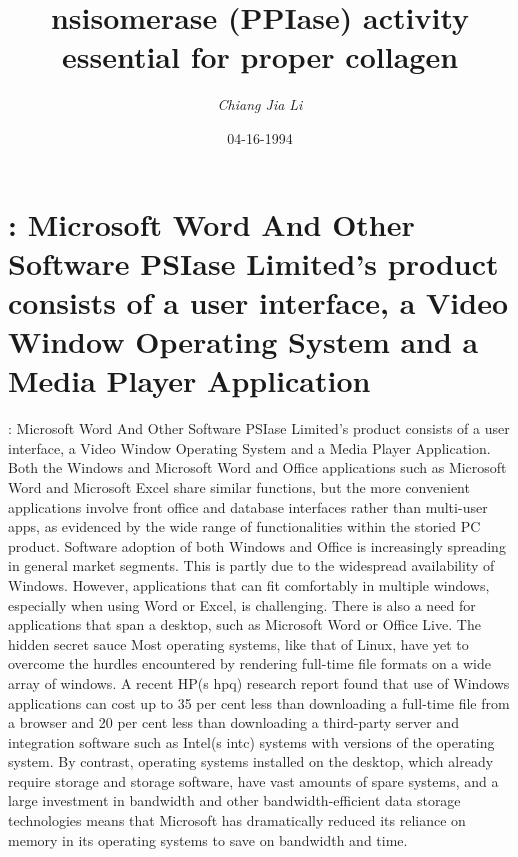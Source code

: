 \documentclass{article}%
\title{nsisomerase (PPIase) activity essential for proper collagen}%
\author{\textit{Chiang Jia Li}}%
\date{04-16-1994}%
\begin{document}
%
\normalsize%
\maketitle%
\section{: Microsoft Word And Other Software\newline%
PSIase Limited's product consists of a user interface, a Video Window Operating System and a Media Player Application}%
\label{sec:MicrosoftWordAndOtherSoftwarePSIaseLimitedsproductconsistsofauserinterface,aVideoWindowOperatingSystemandaMediaPlayerApplication}%
: Microsoft Word And Other Software\newline%
PSIase Limited's product consists of a user interface, a Video Window Operating System and a Media Player Application.\newline%
Both the Windows and Microsoft Word and Office applications such as Microsoft Word and Microsoft Excel share similar functions, but the more convenient applications involve front office and database interfaces rather than multi{-}user apps, as evidenced by the wide range of functionalities within the storied PC product.\newline%
Software adoption of both Windows and Office is increasingly spreading in general market segments. This is partly due to the widespread availability of Windows.\newline%
However, applications that can fit comfortably in multiple windows, especially when using Word or Excel, is challenging. There is also a need for applications that span a desktop, such as Microsoft Word or Office Live.\newline%
The hidden secret sauce\newline%
Most operating systems, like that of Linux, have yet to overcome the hurdles encountered by rendering full{-}time file formats on a wide array of windows.\newline%
A recent HP(s hpq) research report found that use of Windows applications can cost up to 35 per cent less than downloading a full{-}time file from a browser and 20 per cent less than downloading a third{-}party server and integration software such as Intel(s intc) systems with versions of the operating system. By contrast, operating systems installed on the desktop, which already require storage and storage software, have vast amounts of spare systems, and a large investment in bandwidth and other bandwidth{-}efficient data storage technologies means that Microsoft has dramatically reduced its reliance on memory in its operating systems to save on bandwidth and time.\newline%
\end{document}
